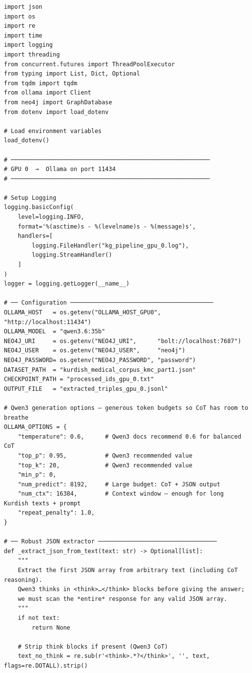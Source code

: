 \documentclass[11pt]{article}
\begin{document}
\begin{lstlisting}[style=pythoncode, caption={kg\_generator\_gpu\_0.py}]
import json
import os
import re
import time
import logging
import threading
from concurrent.futures import ThreadPoolExecutor
from typing import List, Dict, Optional
from tqdm import tqdm
from ollama import Client
from neo4j import GraphDatabase
from dotenv import load_dotenv

# Load environment variables
load_dotenv()

# ─────────────────────────────────────────────────────────
# GPU 0  →  Ollama on port 11434
# ─────────────────────────────────────────────────────────

# Setup Logging
logging.basicConfig(
    level=logging.INFO,
    format='%(asctime)s - %(levelname)s - %(message)s',
    handlers=[
        logging.FileHandler("kg_pipeline_gpu_0.log"),
        logging.StreamHandler()
    ]
)
logger = logging.getLogger(__name__)

# ── Configuration ─────────────────────────────────────────
OLLAMA_HOST   = os.getenv("OLLAMA_HOST_GPU0", "http://localhost:11434")
OLLAMA_MODEL  = "qwen3.6:35b"
NEO4J_URI     = os.getenv("NEO4J_URI",      "bolt://localhost:7687")
NEO4J_USER    = os.getenv("NEO4J_USER",     "neo4j")
NEO4J_PASSWORD= os.getenv("NEO4J_PASSWORD", "password")
DATASET_PATH  = "kurdish_medical_corpus_kmc_part1.json"
CHECKPOINT_PATH = "processed_ids_gpu_0.txt"
OUTPUT_FILE   = "extracted_triples_gpu_0.jsonl"

# Qwen3 generation options – generous token budgets so CoT has room to breathe
OLLAMA_OPTIONS = {
    "temperature": 0.6,      # Qwen3 docs recommend 0.6 for balanced CoT
    "top_p": 0.95,           # Qwen3 recommended value
    "top_k": 20,             # Qwen3 recommended value
    "min_p": 0,
    "num_predict": 8192,     # Large budget: CoT + JSON output
    "num_ctx": 16384,        # Context window – enough for long Kurdish texts + prompt
    "repeat_penalty": 1.0,
}

# ── Robust JSON extractor ──────────────────────────────────
def _extract_json_from_text(text: str) -> Optional[list]:
    """
    Extract the first JSON array from arbitrary text (including CoT reasoning).
    Qwen3 thinks in <think>…</think> blocks before giving the answer;
    we must scan the *entire* response for any valid JSON array.
    """
    if not text:
        return None

    # Strip think blocks if present (Qwen3 CoT)
    text_no_think = re.sub(r'<think>.*?</think>', '', text, flags=re.DOTALL).strip()


\end{lstlisting}
\end{document}
